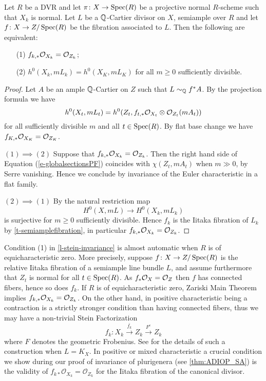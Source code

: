 	
	\begin{lemma}\label{l-stein-invariance}
		Let $R$ be a DVR and let $\pi \colon X \to \operatorname{Spec}(R)$ be a projective normal $R$-scheme such that $X_k$ is normal. 
		Let $L$ be a $\mathbb{Q}$-Cartier divisor on $X$, semiample over $R$ and let $f \colon X \to Z / \operatorname{Spec}(R)$ be the  fibration associated to $L$.
		Then the following are equivalent:
		\begin{enumerate}
			\item[(1)] $f_{k,*} \mathcal{O}_{X_k} = \mathcal{O}_{Z_k}$;
			\item[(2)] $h^0(X_k, mL_k)=h^0(X_K, mL_K)$ for all $m\geq 0$ sufficiently divisible.
		\end{enumerate}
	\end{lemma}
	
	\begin{proof}
		Let $A$ be an ample $\mathbb{Q}$-Cartier on $Z$ such that $L \sim_{\mathbb{Q}}f^*A$. 
		By the projection formula we have 
		\begin{equation}\label{e-globalsectionsPF}
			h^0(X_t,mL_t)=h^0(Z_t,f_{t,\ast}\mathcal{O}_{X_t}\otimes\mathcal{O}_{Z_t}(mA_t))
		\end{equation}
		for all sufficiently divisible $m$ and all $t\in \operatorname{Spec} (R)$. By flat base change we have $f_{K,\ast}\mathcal{O}_{X_K}=\mathcal{O}_{Z_K}$.
		
		$(1) \implies (2)$ Suppose that $f_{k,\ast}\mathcal{O}_{X_k}=\mathcal{O}_{Z_k}$. Then the right hand side of Equation (\ref{e-globalsectionsPF}) coincides with $\chi(Z_t,mA_t)$ when $m\gg 0$, by Serre vanishing. Hence we conclude by invariance of the Euler characteristic in a flat family.
		
		$(2) \implies (1)$ By \cite[Corollary III.12.9]{Ha77} the natural restriction map
		$$H^0(X,mL)\to H^0(X_k,mL_k)$$
		is surjective for $m\geq 0$ sufficiently divisible. Hence $f_k$ is the Iitaka fibration of $L_k$ by \autoref{t-semiamplefibration}, in particular $f_{k,\ast}\mathcal{O}_{X_k}=\mathcal{O}_{Z_k}$. 
	\end{proof}
	
	\begin{remark}\label{r-connected fibers v contraction}
	Condition (1) in \autoref{l-stein-invariance} is almost automatic when $R$ is of equicharacteristic zero. More precisely, suppose $f\colon X\to Z/\operatorname{Spec}(R)$ is the relative Iitaka fibration of a semiample line bundle $L$, and assume furthermore that $Z_t$ is normal for all $t\in\operatorname{Spec}(R)$. As $f_*\mathcal{O}_X=\mathcal{O}_Z$ then $f$ has connected fibers, hence so does $f_k$. If $R$ is of equicharacteristic zero, Zariski Main Theorem implies $f_{k,*}\mathcal{O}_{X_k}=\mathcal{O}_{Z_k}$. On the other hand, in positive characteristic being a contraction is a strictly stronger condition than having connected fibers, thus we may have a non-trivial Stein Factorization
	$$f_k\colon X_k\xrightarrow{\bar{f_k}} Z_k\xrightarrow{F^e}Z_k$$
where $F$ denotes the geometric Frobenius.  
See \cite{Bri20} for the details of such a construction when $L=K_X$.
In positive or mixed characteristic a crucial condition we show during our proof of invariance of plurigenera (see \autoref{thm:ADIOP_SA}) is the validity of $f_{k*} \mathcal{O}_{X_k}=\mathcal{O}_{Z_k}$ for the Iitaka fibration of the canonical divisor.
\end{remark}
	
